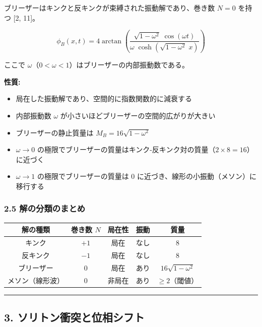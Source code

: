 \documentclass[a4paper,11pt]{ltjsarticle}
\providecommand{\tightlist}{\setlength{\itemsep}{0pt}\setlength{\parskip}{0pt}}
\newcounter{none}
\begin{document}
ブリーザーはキンクと反キンクが束縛された振動解であり、巻き数 \(N = 0\)
を持つ {[}2, 11{]}。

\[\phi_B(x, t) = 4\arctan\left(\frac{\sqrt{1 - \omega^2}\;\cos(\omega t)}{\omega\;\cosh\left(\sqrt{1 - \omega^2}\;x\right)}\right)\]

ここで \(\omega\)（\(0 < \omega < 1\)）はブリーザーの内部振動数である。

\textbf{性質:}

\begin{itemize}
\tightlist
\item
  局在した振動解であり、空間的に指数関数的に減衰する
\item
  内部振動数 \(\omega\) が小さいほどブリーザーの空間的広がりが大きい
\item
  ブリーザーの静止質量は \(M_B = 16\sqrt{1 - \omega^2}\)
\item
  \(\omega \to 0\)
  の極限でブリーザーの質量はキンク-反キンク対の質量（\(2 \times 8 = 16\)）に近づく
\item
  \(\omega \to 1\) の極限でブリーザーの質量は \(0\)
  に近づき、線形の小振動（メソン）に移行する
\end{itemize}

\subsubsection{2.5
解の分類のまとめ}\label{ux89e3ux306eux5206ux985eux306eux307eux3068ux3081}

{\def\LTcaptype{none} %
\begin{longtable}[]{@{}ccccc@{}}
\toprule\noalign{}
解の種類 & 巻き数 \(N\) & 局在性 & 振動 & 質量 \\
\midrule\noalign{}
\endhead
\bottomrule\noalign{}
\endlastfoot
キンク & \(+1\) & 局在 & なし & \(8\) \\
反キンク & \(-1\) & 局在 & なし & \(8\) \\
ブリーザー & \(0\) & 局在 & あり & \(16\sqrt{1-\omega^2}\) \\
メソン（線形波） & \(0\) & 非局在 & あり & \(\geq 2\)（閾値） \\
\end{longtable}
}

\begin{center}\rule{0.5\linewidth}{0.5pt}\end{center}

\subsection{3.
ソリトン衝突と位相シフト}\label{ux30bdux30eaux30c8ux30f3ux885dux7a81ux3068ux4f4dux76f8ux30b7ux30d5ux30c8}
\end{document}
